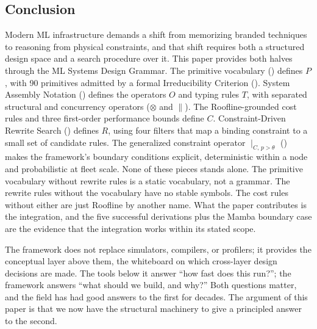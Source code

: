 \documentclass[10pt,twocolumn]{article}
\begin{document}
\subsection{Conclusion}

Modern ML infrastructure demands a shift from memorizing branded techniques to reasoning from physical constraints, and that shift requires both a structured design space and a search procedure over it. This paper provides both halves through the ML Systems Design Grammar. The primitive vocabulary () defines $P$, with 90 primitives admitted by a formal Irreducibility Criterion (). System Assembly Notation () defines the operators $O$ and typing rules $T$, with separated structural and concurrency operators ($\otimes$ and $\parallel$). The Roofline-grounded cost rules and three first-order performance bounds define $C$. Constraint-Driven Rewrite Search () defines $R$, using four filters that map a binding constraint to a small set of candidate rules. The generalized constraint operator $\mid_{C,\, p > \theta}$ () makes the framework's boundary conditions explicit, deterministic within a node and probabilistic at fleet scale. None of these pieces stands alone. The primitive vocabulary without rewrite rules is a static vocabulary, not a grammar. The rewrite rules without the vocabulary have no stable symbols. The cost rules without either are just Roofline by another name. What the paper contributes is the integration, and the five successful derivations plus the Mamba boundary case are the evidence that the integration works within its stated scope.

The framework does not replace simulators, compilers, or profilers; it provides the conceptual layer above them, the whiteboard on which cross-layer design decisions are made. The tools below it answer ``how fast does this run?''; the framework answers ``what should we build, and why?'' Both questions matter, and the field has had good answers to the first for decades. The argument of this paper is that we now have the structural machinery to give a principled answer to the second.

\balance



\clearpage
\onecolumn

\end{document}
